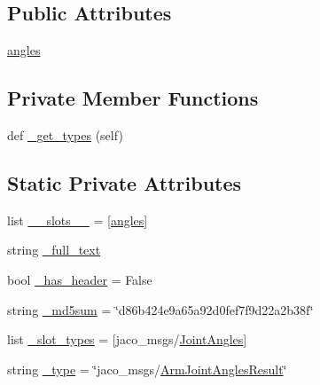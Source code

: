 \subsection*{Public Attributes}
\begin{DoxyCompactItemize}
\item 
\hyperlink{classjaco__msgs_1_1msg_1_1__ArmJointAnglesResult_1_1ArmJointAnglesResult_adf48c1897be485b663d0e2bf26308e07}{angles}
\end{DoxyCompactItemize}
\subsection*{Private Member Functions}
\begin{DoxyCompactItemize}
\item 
def \hyperlink{classjaco__msgs_1_1msg_1_1__ArmJointAnglesResult_1_1ArmJointAnglesResult_a0ae8bacbd93d8916c990f5b608aabbff}{\+\_\+get\+\_\+types} (self)
\end{DoxyCompactItemize}
\subsection*{Static Private Attributes}
\begin{DoxyCompactItemize}
\item 
list \hyperlink{classjaco__msgs_1_1msg_1_1__ArmJointAnglesResult_1_1ArmJointAnglesResult_ac53e49747307bcbe3b3f2236d27c30ce}{\+\_\+\+\_\+slots\+\_\+\+\_\+} = \mbox{[}\textquotesingle{}\hyperlink{classjaco__msgs_1_1msg_1_1__ArmJointAnglesResult_1_1ArmJointAnglesResult_adf48c1897be485b663d0e2bf26308e07}{angles}\textquotesingle{}\mbox{]}
\item 
string \hyperlink{classjaco__msgs_1_1msg_1_1__ArmJointAnglesResult_1_1ArmJointAnglesResult_adc203abfb68dbcff984e0ae0425189a5}{\+\_\+full\+\_\+text}
\item 
bool \hyperlink{classjaco__msgs_1_1msg_1_1__ArmJointAnglesResult_1_1ArmJointAnglesResult_a9917ddd6144c938a121558c001e1f588}{\+\_\+has\+\_\+header} = False
\item 
string \hyperlink{classjaco__msgs_1_1msg_1_1__ArmJointAnglesResult_1_1ArmJointAnglesResult_ad7e85ac7daa3564d90b7e06d2938d03f}{\+\_\+md5sum} = \char`\"{}d86b424e9a65a92d0fef7f9d22a2b38f\char`\"{}
\item 
list \hyperlink{classjaco__msgs_1_1msg_1_1__ArmJointAnglesResult_1_1ArmJointAnglesResult_a9f1b2a58d05e134d7c35b0ee0ab83684}{\+\_\+slot\+\_\+types} = \mbox{[}\textquotesingle{}jaco\+\_\+msgs/\hyperlink{classjaco__msgs_1_1msg_1_1__JointAngles_1_1JointAngles}{Joint\+Angles}\textquotesingle{}\mbox{]}
\item 
string \hyperlink{classjaco__msgs_1_1msg_1_1__ArmJointAnglesResult_1_1ArmJointAnglesResult_a7e0375d86788c1f062334e13db09adda}{\+\_\+type} = \char`\"{}jaco\+\_\+msgs/\hyperlink{classjaco__msgs_1_1msg_1_1__ArmJointAnglesResult_1_1ArmJointAnglesResult}{Arm\+Joint\+Angles\+Result}\char`\"{}
\end{DoxyCompactItemize}


